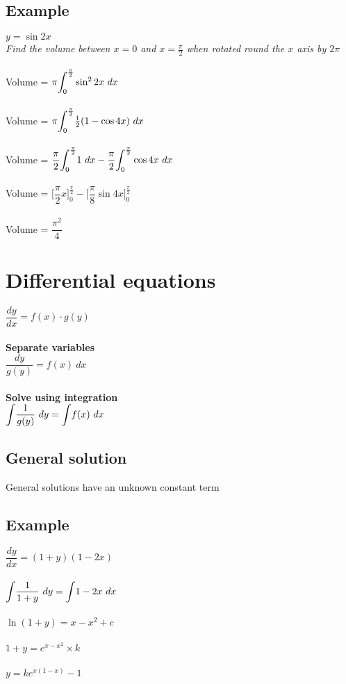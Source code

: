 \documentclass{article}[18pt]
\begin{document}
\subsection{Example}
$y=\sin2x$\\
\textit{Find the volume between $x=0$ and $x=\frac{\pi}{2}$ when rotated round the $x$ axis by $2\pi$}\\
\\
Volume = $\pi\mathlarger{\int_0^\frac{\pi}{2}}\sin^22x \ dx$\\
\\
Volume = $\pi\mathlarger{\int_0^\frac{\pi}{2}}\frac{1}{2}(1-\cos4x) \ dx$\\
\\
Volume = $\dfrac{\pi}{2}\mathlarger{\int_0^\frac{\pi}{2}}1 \ dx - \dfrac{\pi}{2}\mathlarger{\int_0^\frac{\pi}{2}}\cos4x \ dx$\\
\\
Volume = $\Big[\dfrac{\pi}{2}x\Big]^\frac{\pi}{2}_0-\Big[\dfrac{\pi}{8}\sin4x\Big]^\frac{\pi}{2}_0$\\
\\
Volume = $\dfrac{\pi^2}{4}$
\newpage
\section{Differential equations}
$\dfrac{dy}{dx}=f(x)\cdot g(y)$\\
\\
\textbf{Separate variables}\\
$\dfrac{dy}{g(y)}=f(x) \ dx$\\
\\
\textbf{Solve using integration}\\
$\mathlarger{\int}\dfrac{1}{g(y)} \ dy=\mathlarger{\int}f(x) \ dx$
\subsection{General solution}
General solutions have an unknown constant term
\subsection{Example}
$\dfrac{dy}{dx}=(1+y)(1-2x)$\\
\\
$\mathlarger{\int}\dfrac{1}{1+y} \ dy = \mathlarger{\int}1-2x \ dx$\\
\\
$\ln(1+y)=x-x^2+c$\\
\\
$1+y=e^{x-x^2}\times k$\\
\\
$y=ke^{x(1-x)}-1$
\end{document}

